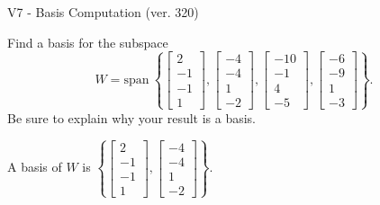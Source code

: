 \begin{exercise}
  \begin{exerciseTitle}V7 - Basis Computation (ver. 320)\end{exerciseTitle}
  \begin{exerciseStatement}
    Find a basis for the subspace 
\[W=\mathrm{span}\ \left\{\left[\begin{array}{r}
2 \\
-1 \\
-1 \\
1
\end{array}\right] , \left[\begin{array}{r}
-4 \\
-4 \\
1 \\
-2
\end{array}\right] , \left[\begin{array}{r}
-10 \\
-1 \\
4 \\
-5
\end{array}\right] , \left[\begin{array}{r}
-6 \\
-9 \\
1 \\
-3
\end{array}\right]\right\}.\]
 Be sure to explain why your result is a basis.


  \end{exerciseStatement}
  \begin{exerciseAnswer}
   A basis of \(W\) is  \(\left\{\left[\begin{array}{r}
2 \\
-1 \\
-1 \\
1
\end{array}\right] , \left[\begin{array}{r}
-4 \\
-4 \\
1 \\
-2
\end{array}\right]\right\}\).
  


  \end{exerciseAnswer}
\end{exercise}
